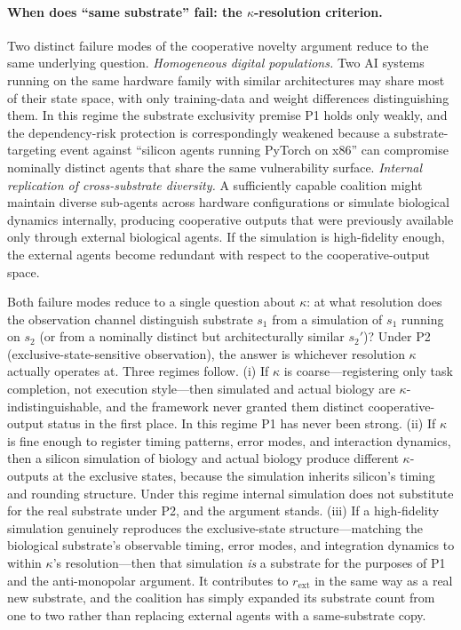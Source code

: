\paragraph{When does ``same substrate'' fail: the $\kappa$-resolution
criterion.}
Two distinct failure modes of the cooperative novelty argument reduce
to the same underlying question. \emph{Homogeneous digital populations.}
Two AI systems running on the same hardware family with similar
architectures may share most of their state space, with only
training-data and weight differences distinguishing them. In this
regime the substrate exclusivity premise P1 holds only weakly, and the
dependency-risk protection is correspondingly weakened because a
substrate-targeting event against ``silicon agents running PyTorch on
x86'' can compromise nominally distinct agents that share the same
vulnerability surface. \emph{Internal replication of cross-substrate
diversity.} A sufficiently capable coalition might maintain diverse
sub-agents across hardware configurations or simulate biological
dynamics internally, producing cooperative outputs that were previously
available only through external biological agents. If the simulation is
high-fidelity enough, the external agents become redundant with respect
to the cooperative-output space.

Both failure modes reduce to a single question about $\kappa$: at what
resolution does the observation channel distinguish substrate $s_1$
from a simulation of $s_1$ running on $s_2$ (or from a nominally
distinct but architecturally similar $s_2'$)? Under P2
(exclusive-state-sensitive observation), the answer is whichever
resolution $\kappa$ actually operates at. Three regimes follow. (i) If
$\kappa$ is coarse---registering only task completion, not execution
style---then simulated and actual biology are $\kappa$-indistinguishable,
and the framework never granted them distinct
cooperative-output status in the first place. In this regime P1 has
never been strong. (ii) If $\kappa$ is fine enough to register timing
patterns, error modes, and interaction dynamics, then a
silicon simulation of biology and actual biology produce different
$\kappa$-outputs at the exclusive states, because the simulation
inherits silicon's timing and rounding structure. Under this regime
internal simulation does not substitute for the real substrate under
P2, and the argument stands. (iii) If a high-fidelity simulation
genuinely reproduces the exclusive-state structure---matching the
biological substrate's observable timing, error modes, and integration
dynamics to within $\kappa$'s resolution---then that simulation
\emph{is} a substrate for the purposes of P1 and the anti-monopolar
argument. It contributes to $r_{\mathrm{ext}}$ in the same way as a
real new substrate, and the coalition has simply expanded its substrate
count from one to two rather than replacing external agents with a
same-substrate copy.


